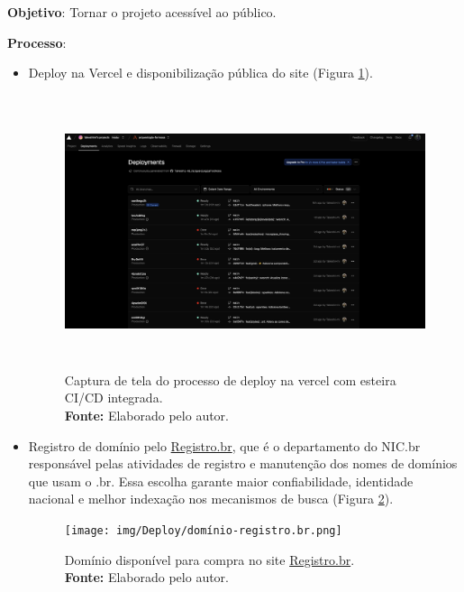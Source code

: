\textbf{Objetivo}: Tornar o projeto acessível ao público.

\textbf{Processo}:
\begin{itemize}
    \item Deploy na Vercel e disponibilização pública do site (Figura \ref{fig:deploy_vercel}). 
\begin{figure}[H]
    \centering
    \includegraphics[height=8cm, keepaspectratio]{img/Deploy/deploy_vercel.png}
    \caption{ Captura de tela do processo de deploy na vercel com esteira CI/CD integrada. \\
        \textbf{Fonte:} Elaborado pelo autor.}
    \label{fig:deploy_vercel}
\end{figure}

    \item Registro de domínio pelo \href{www.registro.br}{Registro.br}, que é o departamento do NIC.br responsável pelas atividades de registro e manutenção dos nomes de domínios que usam o .br. Essa escolha garante maior confiabilidade, identidade nacional e melhor indexação nos mecanismos de busca (Figura \ref{fig:dominio_registro_br}).
\begin{figure}[H]
    \centering
    \texttt{[image: img/Deploy/domínio-registro.br.png]}
    \caption{ Domínio disponível para compra no site \href{www.registro.br}{Registro.br}. \\
        \textbf{Fonte:} Elaborado pelo autor.}
    \label{fig:dominio_registro_br}
\end{figure}


\end{itemize}

